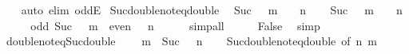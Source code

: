 \begin{isabellebody}
%
\isadelimproof
\ \ %
\endisadelimproof
%
\isatagproof
{}\isamarkupfalse%
\ {\isacharparenleft}{\kern0pt}auto\ elim{\isacharcolon}{\kern0pt}\ oddE{\isacharparenright}{\kern0pt}%
\endisatagproof
{\isafoldproof}%
%
\isadelimproof
\isanewline
%
\endisadelimproof
\isanewline
{}\isamarkupfalse%
\ Suc{\isacharunderscore}{\kern0pt}double{\isacharunderscore}{\kern0pt}not{\isacharunderscore}{\kern0pt}eq{\isacharunderscore}{\kern0pt}double{\isacharcolon}{\kern0pt}\isanewline
\ \ {\isachardoublequoteopen}Suc\ {\isacharparenleft}{\kern0pt}{}\ {\isacharasterisk}{\kern0pt}\ m{\isacharparenright}{\kern0pt}\ {\isasymnoteq}\ {}\ {\isacharasterisk}{\kern0pt}\ n{\isachardoublequoteclose}\isanewline
%
\isadelimproof
%
\endisadelimproof
%
\isatagproof
{}\isamarkupfalse%
\isanewline
\ \ \isamarkupfalse%
\ {\isachardoublequoteopen}Suc\ {\isacharparenleft}{\kern0pt}{}\ {\isacharasterisk}{\kern0pt}\ m{\isacharparenright}{\kern0pt}\ {\isacharequal}{\kern0pt}\ {}\ {\isacharasterisk}{\kern0pt}\ n{\isachardoublequoteclose}\isanewline
\ \ \isamarkupfalse%
\ \isamarkupfalse%
\ {\isachardoublequoteopen}odd\ {\isacharparenleft}{\kern0pt}Suc\ {\isacharparenleft}{\kern0pt}{}\ {\isacharasterisk}{\kern0pt}\ m{\isacharparenright}{\kern0pt}{\isacharparenright}{\kern0pt}{\isachardoublequoteclose}\ \ {\isachardoublequoteopen}even\ {\isacharparenleft}{\kern0pt}{}\ {\isacharasterisk}{\kern0pt}\ n{\isacharparenright}{\kern0pt}{\isachardoublequoteclose}\isanewline
\ \ \ \ \isamarkupfalse%
\ simp{\isacharunderscore}{\kern0pt}all\isanewline
\ \ \isamarkupfalse%
\ \isamarkupfalse%
\ False\ \isamarkupfalse%
\ simp\isanewline
{}\isamarkupfalse%
%
\endisatagproof
{\isafoldproof}%
%
\isadelimproof
\isanewline
%
\endisadelimproof
\isanewline
{}\isamarkupfalse%
\ double{\isacharunderscore}{\kern0pt}not{\isacharunderscore}{\kern0pt}eq{\isacharunderscore}{\kern0pt}Suc{\isacharunderscore}{\kern0pt}double{\isacharcolon}{\kern0pt}\isanewline
\ \ {\isachardoublequoteopen}{}\ {\isacharasterisk}{\kern0pt}\ m\ {\isasymnoteq}\ Suc\ {\isacharparenleft}{\kern0pt}{}\ {\isacharasterisk}{\kern0pt}\ n{\isacharparenright}{\kern0pt}{\isachardoublequoteclose}\isanewline
%
\isadelimproof
\ \ %
\endisadelimproof
%
\isatagproof
{}\isamarkupfalse%
\ Suc{\isacharunderscore}{\kern0pt}double{\isacharunderscore}{\kern0pt}not{\isacharunderscore}{\kern0pt}eq{\isacharunderscore}{\kern0pt}double\ {\isacharbrackleft}{\kern0pt}of\ n\ m{\isacharbrackright}{\kern0pt}\ \isamarkupfalse%

\end{isabellebody}
